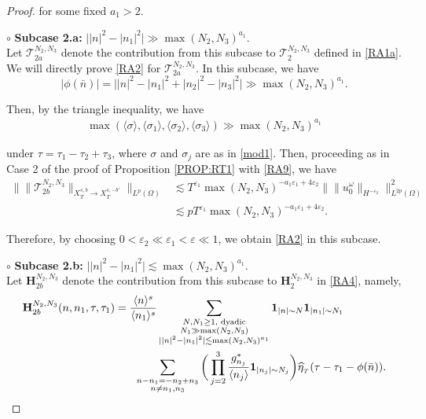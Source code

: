 \documentclass[%
11pt,  reqno]{amsart}
\newcommand{\1}{\hspace{0.2mm}\text{I}\hspace{0.2mm}}
\newcommand{\noi}{\noindent}
\newcommand{\eps}{\varepsilon}
\newcommand{\s}{\sigma}
\newcommand{\ft}{\widehat}
\renewcommand{\o}{\omega}
\renewcommand{\O}{\Omega}
\newcommand{\les}{\lesssim}
\newcommand{\jb}[1]
{\langle #1 \rangle}
\newcommand{\ind}{\mathbf 1}
\numberwithin{equation}{section}
\numberwithin{theorem}{section}
\newcommand{\Hb}{\mathbf{H}}
\newcommand{\TT}{\mathcal{T}}
\begin{document}
\begin{proof}
\noi
for some fixed  $a_1 > 2$.

%




\medskip

\noi
$\pmb\circ$ {\bf Subcase 2.a:}
$\big| |n|^2 - |n_1|^2 \big| \gg \max (N_2, N_3)^{a_1}$.
\\
\indent
Let $\TT_{2a}^{N_2,N_3}$
 denote the contribution
from this subcase 
to $\TT_{2}^{N_2,N_3}$ defined in \eqref{RA1a}.
We will directly prove
\eqref{RA2} for $\TT_{2a}^{N_2,N_3}$.
In this subcase, we have 
\[
|\phi(\bar n)| = \big||n|^2 - |n_1|^2 + |n_2|^2 - |n_3|^2\big| \gg \max (N_2, N_3)^{a_1}. 
\]

\noi
Then, by the triangle inequality, 
we have 
\begin{align}
\max (\jb{\s}, \jb{\s_1},\jb{\s_2}, \jb{\s_3}) \gg \max (N_2, N_3)^{a_1}
\label{RA9}
\end{align}

\noi
under $\tau = \tau_1 - \tau_2 + \tau_3$, 
where $\s$ and $\s_j$ are as in \eqref{mod1}.
Then, proceeding as in Case 2 of the proof of 
 Proposition \ref{PROP:RT1}
 with \eqref{RA9}, we have
\begin{align*}
\Big\| \| \TT_{2b}^{N_2,N_3} \|_{X^{s,b}_T \to 
X^{s,-b'}_T} \Big\|_{L^p (\O)}  
& \les 
T^{\eps_1} \max (N_2, N_3)^{-a_1\eps_1+ 4\eps_2}
\big\|\| u_0^\o\|_{H^{-\eps_2}}\big\|_{L^{2p} (\O)}^2  \\
& \les p
T^{\eps_1} \max (N_2, N_3)^{-a_1\eps_1+ 4\eps_2}.
\end{align*}

\noi
Therefore, 
by choosing  $0 < \eps_2 \ll \eps_1 < \eps \ll1$, 
we obtain \eqref{RA2} in this subcase.







\medskip

\noi
$\pmb\circ$ {\bf Subcase 2.b:}
$\big| |n|^2 - |n_1|^2 \big| \les \max (N_2, N_3)^{a_1}$.
\\
\indent
Let  $ \Hb_{2b}^{N_2, N_3}$ denote the contribution
from  this subcase
to $\Hb_2^{N_2, N_3}$ in \eqref{RA4}, namely,  
\begin{align}
\begin{split}
 \Hb_{2b}^{N_2, N_3}(n,n_1,\tau, \tau_1)
&   = 
 \frac{\jb{n}^{s}}{ \jb{n_1}^{s}} \sum_{\substack{N, N_1 \ge 1, \text{ dyadic}\\ N_1 \gg \max (N_2, N_3)\\
| |n|^2 - |n_1|^2 | \les \max (N_2, N_3)^{a_1}}} 
\ind_{|n|\sim N} \ind_{|n_1|\sim N_1}
\\
& \hphantom{XX}
\sum_{\substack{n - n_1 = - n_2 + n_3\\ n \neq n_1,n_3}} 
\bigg(\prod_{j = 2}^3 
\frac{g^*_{n_j} }{\jb{n_j}}
\ind_{|n_j|\sim N_j}\bigg)
\ft \eta_{_T} (\tau - \tau_1 - \phi (\bar n))  .
\end{split}
\label{RA12}
\end{align}


\end{proof}
\end{document}
